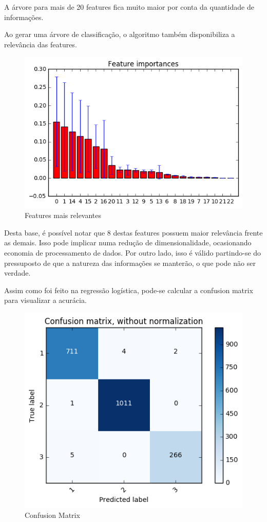 A árvore para mais de 20 features fica muito maior por conta da quantidade de informações.


Ao gerar uma árvore de classificação, o algoritmo também disponibiliza a relevância das features.

\begin{figure}[!ht]
\caption{Features mais relevantes}
\centerline{\includegraphics[width=.7\textwidth]{img/tree-most-important-features}}
\end{figure}

Desta base, é possível notar que 8 destas features possuem maior relevância frente as demais. Isso pode implicar numa redução de dimensionalidade, ocasionando economia de processamento de dados. Por outro lado, isso é válido partindo-se do pressuposto de que a natureza das informações se manterão, o que pode não ser verdade.

%
%

Assim como foi feito na regressão logística, pode-se calcular a confusion matrix para visualizar a acurácia.

\begin{figure}[!ht]
\caption{Confusion Matrix}
\centerline{\includegraphics[width=.6\textwidth]{img/confusionMatrix}}
\end{figure}



